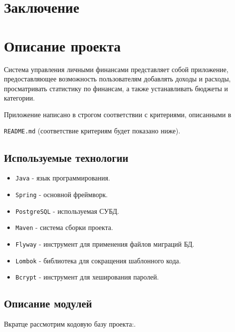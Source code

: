 \documentclass[a4paper, 14pt]{article}
\begin{document}
\newpage
\section{Заключение}


\iffalse
\section{Описание проекта}

Система управления личными финансами представляет собой приложение, предоставляющее возможность пользователям добавлять доходы и расходы, просматривать статистику по финансам, а также устанавливать бюджеты и категории.

Приложение написано в строгом соответствии с критериями, описанными в

\texttt{README.md} (соответствие критериям будет показано ниже).

\subsection{Используемые технологии}

\begin{itemize}
	\item \texttt{Java} - язык программирования.
	\item \texttt{Spring} - основной фреймворк.
	\item \texttt{PostgreSQL} - используемая СУБД.
	\item \texttt{Maven} - система сборки проекта.
	\item \texttt{Flyway} - инструмент для применения файлов миграций БД.
	\item \texttt{Lombok} - библиотека для сокращения шаблонного кода.
	\item \texttt{Bcrypt} - инструмент для хеширования паролей.
\end{itemize}

\subsection{Описание модулей}

Вкратце рассмотрим кодовую базу проекта:.
\end{document}

